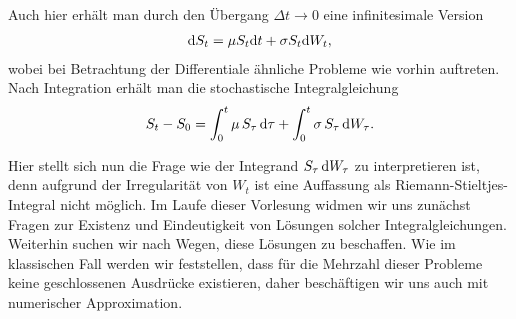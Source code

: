 Auch hier erhält man durch den Übergang $\Delta t \to 0$ eine infinitesimale
Version
\begin{align*}
\mathrm{d} S_t = \mu S_t \mathrm{d} t + \sigma S_t \mathrm{d} W_t,
\end{align*}
wobei bei Betrachtung der Differentiale ähnliche Probleme wie vorhin auftreten.
Nach Integration erhält man die stochastische Integralgleichung
\begin{align*}
S_t - S_0 = \int_0^t \mu\, S_\tau\, \mathrm{d} \tau + \int_0^t \sigma\, S_\tau\,
\mathrm{d} W_\tau.
\end{align*}

Hier stellt sich nun die Frage wie der Integrand $S_\tau \,\mathrm{d} W_\tau$ zu
interpretieren ist, denn aufgrund der Irregularität von $W_t$ ist eine
Auffassung als Riemann-Stieltjes-Integral nicht möglich. 
Im Laufe dieser Vorlesung widmen wir uns zunächst Fragen zur Existenz und
Eindeutigkeit von Lösungen solcher Integralgleichungen. Weiterhin suchen
wir nach Wegen, diese Lösungen zu beschaffen. Wie im klassischen Fall
werden wir feststellen, dass für die Mehrzahl dieser Probleme keine
geschlossenen Ausdrücke existieren, daher beschäftigen wir uns
auch mit numerischer Approximation.

